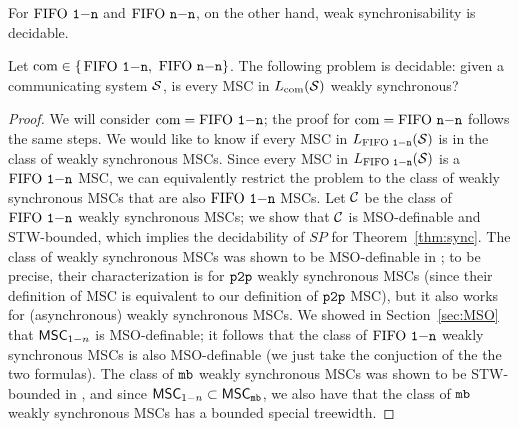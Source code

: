 For $\text{FIFO } \mathtt{1\mathsf{-}n}$ and $\text{FIFO } \mathtt{n\mathsf{-}n}$, on the other hand, weak synchronisability is decidable. 

\begin{proposition}\label{thm:weak-sync}
	Let $\textup{com} \in \{$$\text{FIFO } \mathtt{1\mathsf{-}n}, $ $\text{FIFO } \mathtt{n\mathsf{-}n}\}$.
	The following problem is decidable:
	given a communicating system $\mathcal{S}$,
	is every MSC in $L_{\textup{com}}(\mathcal{S})$ weakly synchronous?
\end{proposition}

\begin{proof}

	We will consider $\textup{com} = \text{FIFO } \mathtt{1\mathsf{-}n}$; the proof for $\textup{com} = \text{FIFO } \mathtt{n\mathsf{-}n}$ follows the same steps. We would like to know if every MSC in $L_{\text{FIFO } \mathtt{1\mathsf{-}n}}(\mathcal{S})$ is in the class of weakly synchronous MSCs. Since every MSC in $L_{\text{FIFO } \mathtt{1\mathsf{-}n}}(\mathcal{S})$ is a $\text{FIFO } \mathtt{1\mathsf{-}n}$ MSC, we can equivalently restrict the problem to the class of weakly synchronous MSCs that are also $\text{FIFO } \mathtt{1\mathsf{-}n}$ MSCs. Let $\mathcal{C}$ be the class of $\text{FIFO } \mathtt{1\mathsf{-}n}$ weakly synchronous MSCs; we show that $\mathcal{C}$ is MSO-definable and STW-bounded, which implies the decidability of $SP$ for Theorem~\ref{thm:sync}. The class of weakly synchronous MSCs was shown to be MSO-definable in \cite{BolligGFLLS21}; to be precise, their characterization is for $\mathtt{p2p}$ weakly synchronous MSCs (since their definition of MSC is equivalent to our definition of $\mathtt{p2p}$ MSC), but it also works for (asynchronous) weakly synchronous MSCs. We showed in Section~\ref{sec:MSO} that $\mathsf{MSC}_{1\mathsf{-}n}$ is MSO-definable; it follows that the class of $\text{FIFO } \mathtt{1\mathsf{-}n}$ weakly synchronous MSCs is also MSO-definable (we just take the conjuction of the the two formulas). The class of $\mathtt{mb}$ weakly synchronous MSCs was shown to be STW-bounded in \cite{BolligGFLLS21}, and since $\mathsf{MSC}_{1\mathsf{-}n} \subset \mathsf{MSC}_{\mathtt{mb}}$, we also have that the class of $\mathtt{mb}$ weakly synchronous MSCs has a bounded special treewidth. 
\end{proof}

